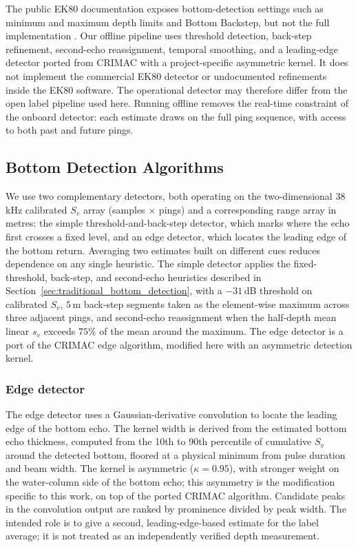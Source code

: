 The public EK80 documentation exposes bottom-detection settings such as minimum and maximum depth limits and Bottom Backstep, but not the full implementation \cite{simrad_ek80_reference_2025}. Our offline pipeline uses threshold detection, back-step refinement, second-echo reassignment, temporal smoothing, and a leading-edge detector ported from CRIMAC with a project-specific asymmetric kernel. It does not implement the commercial EK80 detector or undocumented refinements inside the EK80 software. The operational detector may therefore differ from the open label pipeline used here. Running offline removes the real-time constraint of the onboard detector: each estimate draws on the full ping sequence, with access to both past and future pings.

\subsection{Bottom Detection Algorithms}

We use two complementary detectors, both operating on the two-dimensional 38\,kHz calibrated $S_v$ array (samples $\times$ pings) and a corresponding range array in metres: the simple threshold-and-back-step detector, which marks where the echo first crosses a fixed level, and an edge detector, which locates the leading edge of the bottom return. Averaging two estimates built on different cues reduces dependence on any single heuristic. The simple detector applies the fixed-threshold, back-step, and second-echo heuristics described in Section~\ref{sec:traditional_bottom_detection}, with a $-31$\,dB threshold on calibrated $S_v$, $5$\,m back-step segments taken as the element-wise maximum across three adjacent pings, and second-echo reassignment when the half-depth mean linear $s_v$ exceeds $75\%$ of the mean around the maximum. The edge detector is a port of the CRIMAC edge algorithm, modified here with an asymmetric detection kernel.

\subsubsection{Edge detector}

The edge detector uses a Gaussian-derivative convolution to locate the leading edge of the bottom echo. The kernel width is derived from the estimated bottom echo thickness, computed from the 10th to 90th percentile of cumulative $S_v$ around the detected bottom, floored at a physical minimum from pulse duration and beam width. The kernel is asymmetric ($\kappa = 0.95$), with stronger weight on the water-column side of the bottom echo; this asymmetry is the modification specific to this work, on top of the ported CRIMAC algorithm. Candidate peaks in the convolution output are ranked by prominence divided by peak width. The intended role is to give a second, leading-edge-based estimate for the label average; it is not treated as an independently verified depth measurement.

